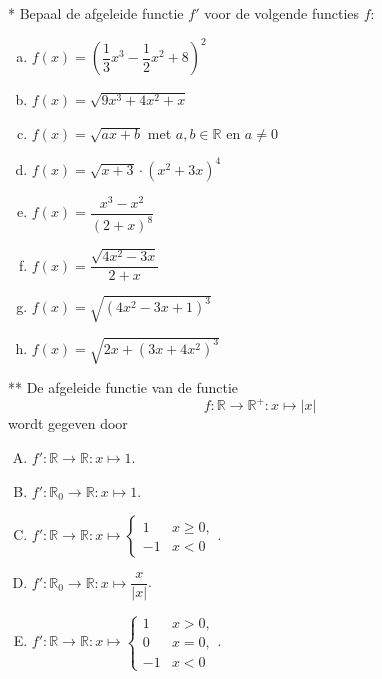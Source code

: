 \documentclass[a4paper,12pt,twoside]{article}
\begin{document}
\begin{oefening}*
  Bepaal de afgeleide functie $f'$ voor de volgende functies $f$:
  \begin{multicols}{2}
  \begin{enumerate}[(a)]
  \itemsep1em
  \item $\displaystyle f(x)=(\dfrac{1}{3}x^3-\dfrac{1}{2}x^2+8)^2$
  \item $\displaystyle f(x)=\sqrt{9x^3+4x^2+x}$
  \item $\displaystyle f(x)=\sqrt{ax+b}$ met $a,b\in\mathbb{R}$ en $a\neq 0$
  \item $\displaystyle f(x)=\sqrt{x+3}\cdot(x^2+3x)^4$
  \item $\displaystyle f(x)=\dfrac{x^3-x^2}{(2+x)^8}$
  \item $\displaystyle f(x)=\dfrac{\sqrt{4x^2-3x}}{2+x}$
  \item $\displaystyle f(x)=\sqrt{(4x^2-3x+1)^3}$
  \item $\displaystyle f(x)=\sqrt{2x+(3x+4x^2)^3}$
  \end{enumerate}
  \end{multicols}
\end{oefening}

\begin{oefening}** %
De afgeleide functie van de functie
$$f:\mathbb{R}\to\mathbb{R^+}:x\mapsto |x|$$
wordt gegeven door
\begin{enumerate}[(A)]
  \itemsep.5em
\item $f':\mathbb{R}\to\mathbb{R}:x\mapsto 1$.
\item $f':\mathbb{R}_0\to\mathbb{R}:x\mapsto 1$.
\item $f':\mathbb{R}\to\mathbb{R}:x\mapsto \begin{cases}1  & x\geq0,\\-1 & x<0\end{cases}$.
\item $f':\mathbb{R}_0\to\mathbb{R}:x\mapsto \dfrac{x}{|x|}$.
\item $f':\mathbb{R}\to\mathbb{R}:x\mapsto \begin{cases}1  & x>0,\\0  & x=0,\\-1 & x<0\end{cases}$.
\end{enumerate}
\end{oefening}
\end{document}
